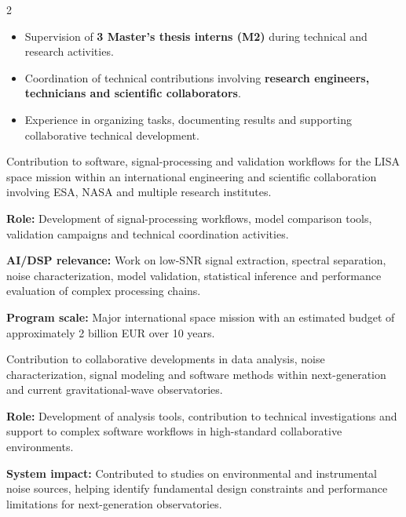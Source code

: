 \documentclass[8pt,a4paper,ragged2e,withhyper]{altacv}
\begin{document}
\begin{paracol}{2}

\begin{itemize}
  \item Supervision of \textbf{3 Master's thesis interns (M2)} during technical and research activities.
  \item Coordination of technical contributions involving \textbf{research engineers, technicians and scientific collaborators}.
  \item Experience in organizing tasks, documenting results and supporting collaborative technical development.
\end{itemize}

\end{paracol}

\newpage



Contribution to software, signal-processing and validation workflows for the LISA space mission within an international engineering and scientific collaboration involving ESA, NASA and multiple research institutes.

\textbf{Role:} Development of signal-processing workflows, model comparison tools, validation campaigns and technical coordination activities.

\textbf{AI/DSP relevance:} Work on low-SNR signal extraction, spectral separation, noise characterization, model validation, statistical inference and performance evaluation of complex processing chains.

\textbf{Program scale:} Major international space mission with an estimated budget of approximately 2 billion EUR over 10 years.

\divider


Contribution to collaborative developments in data analysis, noise characterization, signal modeling and software methods within next-generation and current gravitational-wave observatories.

\textbf{Role:} Development of analysis tools, contribution to technical investigations and support to complex software workflows in high-standard collaborative environments.

\textbf{System impact:} Contributed to studies on environmental and instrumental noise sources, helping identify fundamental design constraints and performance limitations for next-generation observatories.
\end{document}
